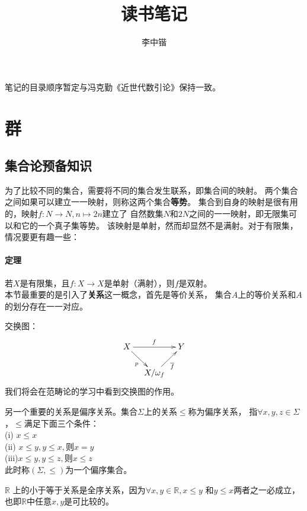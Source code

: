 \documentclass{article}
\begin{document}
\title{读书笔记}
\author{李中锴}
\maketitle

笔记的目录顺序暂定与冯克勤《近世代数引论》保持一致。

\tableofcontents

\section{群}
\subsection{集合论预备知识}
为了比较不同的集合，需要将不同的集合发生联系，即集合间的映射。
两个集合之间如果可以建立一一映射，则称这两个集合\textbf{等势}。
集合到自身的映射是很有用的，映射$f:N \to N, n \mapsto 2n$建立了
自然数集$N$和$2N$之间的一一映射，即无限集可以和它的一个真子集等势。
该映射是单射，然而却显然不是满射。对于有限集，情况要更有趣一些：

\paragraph{定理} 若$X$是有限集，且$f: X \to X$是单射（满射），则$f$是双射。
\\

本节最重要的是引入了\textbf{关系}这一概念，首先是等价关系，
集合$A$上的等价关系和$A$的划分存在一一对应。

交换图：
\begin{equation*}
    \xymatrix@R=17pt@C=10pt{
        X \ar^f[rr] \ar_p[dr]&                                 & Y \\
                             &X/\omega_f \ar_{\overline{f}}[ur]&
    }
\end{equation*}
我们将会在范畴论的学习中看到交换图的作用。

另一个重要的关系是偏序关系。集合$\Sigma$上的关系$\leq$称为偏序关系，
指$\forall x,y,z \in \Sigma$，$\leq$满足下面三个条件：\\
(i)  $x \leq x$\\
(ii) $x \leq y, y \leq x,\text{则}x=y$\\
(iii)$x \leq y, y \leq z,\text{则}x \leq z$\\
此时称$(\Sigma, \leq)$为一个偏序集合。

$\mathbb{R}$ 上的小于等于关系是全序关系，因为$\forall x,y \in \mathbb{R}, x \leq y$
和$y \leq x$两者之一必成立，也即$\mathbb{R}$中任意$x,y$是可比较的。
\end{document}
